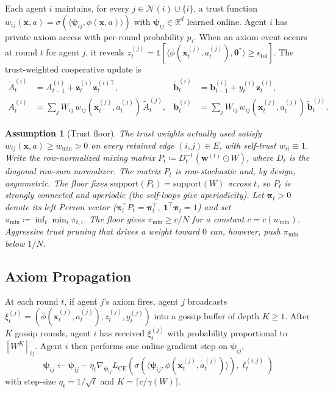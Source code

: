 \documentclass[11pt]{article}
\newtheorem{assumption}[theorem]{Assumption}
\begin{document}
Each agent $i$ maintains, for every $j\in\mathcal{N}(i)\cup\{i\}$,
a trust function
$w_{ij}(\bm{x},a)=\sigma(\langle\bm{\psi}_{ij},\phi(\bm{x},a)\rangle)$
with $\bm{\psi}_{ij}\in\mathbb{R}^d$ learned online.
Agent $i$ has private axiom access with per-round probability $p_i$.
When an axiom event occurs at round $t$ for agent $j$, it reveals
$z_t^{(j)}=\mathbb{1}[\langle\phi(\bm{x}_t^{(j)},a_t^{(j)}),
\bm{\theta}^{\!*}\rangle\geq\epsilon_{\mathrm{tol}}]$.
The trust-weighted cooperative update is
\begin{align*}
\widetilde{A}_t^{(i)}&=A_{t-1}^{(i)}+\bm{z}_t^{(i)}\bm{z}_t^{(i)\top},
&\widetilde{\bm{b}}_t^{(i)}&=\bm{b}_{t-1}^{(i)}+y_t^{(i)}\bm{z}_t^{(i)},\\
A_t^{(i)}&=\sum_j W_{ij}\,w_{ij}(\bm{x}_t^{(j)},a_t^{(j)})\,\widetilde{A}_t^{(j)},
&\bm{b}_t^{(i)}&=\sum_j W_{ij}\,w_{ij}(\bm{x}_t^{(j)},a_t^{(j)})\,\widetilde{\bm{b}}_t^{(j)}.
\end{align*}

\begin{assumption}[Trust floor]\label{ass:trustfloor}
The trust weights actually used satisfy
$w_{ij}(\bm{x},a)\geq w_{\min}>0$ on every retained edge $(i,j)\in E$,
with self-trust $w_{ii}\equiv 1$.  Write the row-normalized mixing matrix
$P_t\coloneqq D_t^{-1}(\bm{w}^{(t)}\odot W)$, where $D_t$ is the diagonal
row-sum normalizer. The matrix $P_t$ is row-stochastic and, by design,
\emph{asymmetric}.  The floor fixes
$\mathrm{support}(P_t)=\mathrm{support}(W)$ across $t$, so $P_t$ is
strongly connected and aperiodic (the self-loops give aperiodicity).
Let $\bm{\pi}_t>0$ denote its left Perron vector
($\bm{\pi}_t^\top P_t=\bm{\pi}_t^\top$,
$\mathbf 1^\top\bm{\pi}_t=1$) and set
$\pi_{\min}\coloneqq\inf_t\min_i\pi_{t,i}$.  The floor gives
$\pi_{\min}\geq c/N$ for a constant $c=c(w_{\min})$.  Aggressive trust
pruning that drives a weight toward $0$ can, however, push $\pi_{\min}$
\emph{below} $1/N$.
\end{assumption}

\subsection{Axiom Propagation}\label{sec:axiom_prop}

At each round $t$, if agent $j$'s axiom fires, agent $j$ broadcasts
$\xi_t^{(j)}=(\phi(\bm{x}_t^{(j)},a_t^{(j)}),z_t^{(j)},y_t^{(j)})$
into a gossip buffer of depth $K\geq 1$.
After $K$ gossip rounds, agent $i$ has received $\xi_t^{(j)}$ with
probability proportional to $[W^K]_{ij}$.
Agent $i$ then performs one online-gradient step on $\bm{\psi}_{ij}$,
\[
\bm{\psi}_{ij}\leftarrow\bm{\psi}_{ij}
-\eta_t\nabla_{\bm{\psi}_{ij}}L_{\mathrm{CE}}\!\left(
\sigma(\langle\bm{\psi}_{ij},\phi(\bm{x}_t^{(j)},a_t^{(j)})\rangle),
\ell_t^{(i,j)}\right)
\]
with step-size $\eta_t=1/\sqrt{t}$ and $K=\lceil c/\gamma(W)\rceil$.
\end{document}
